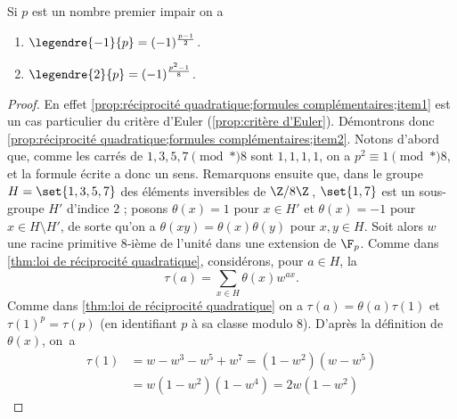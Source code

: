 \documentclass[11pt, useosf,
  title in boldface,
  theorem in new line,
  theorem numbering = section,
  number theorems separately,
]{simplivre}
\begin{document}
\enlargethispage*{\baselineskip}
    \begin{proposition}\label{prop:réciprocité quadratique;formules complémentaires}
        Si \( p \) est un nombre premier impair on a
        \begin{enumerate}
            \item \label{prop:réciprocité quadratique;formules complémentaires;item1} \( \legendre{-1}{p} = (-1)^{\frac{p-1}{2}} \).
            \item \label{prop:réciprocité quadratique;formules complémentaires;item2} \( \legendre{2}{p} = (-1)^{\frac{p^2-1}{8}} \).
        \end{enumerate}
    \end{proposition}
    \begin{proof}
        En effet \ref{prop:réciprocité quadratique;formules complémentaires;item1} est un cas particulier du critère d'Euler (\cref{prop:critère d'Euler}). Démontrons donc \ref{prop:réciprocité quadratique;formules complémentaires;item2}. Notons d'abord que, comme les carrés de \( 1,3,5,7 \pmod*{8} \) sont \( 1,1,1,1 \), on a \( p^2 \equiv 1 \pmod*{8} \), et la formule écrite a donc un sens. Remarquons ensuite que, dans le groupe \( H = \set{1,3,5,7} \) des éléments inversibles de \( \Z/8\Z \)\,, \( \set{1,7} \) est un sous-groupe \( H' \) d'indice \( 2 \) ; posons \( \theta(x) = 1 \) pour \( x \in H' \) et \( \theta(x) = -1 \) pour \( x \in H \setminus H' \), de sorte qu'on a \( \theta(xy) = \theta(x)\theta(y) \) pour \( x,y \in H \). Soit alors \( w \) une racine primitive \( 8 \)‑ième de l'unité dans une extension de \( \F_p \). Comme dans \cref{thm:loi de réciprocité quadratique}, considérons, pour \( a \in H \), la 
        \begin{equation}
            \tau(a) = \sum_{x \in H} \theta(x) w^{ax}.
        \end{equation}
        Comme dans \cref{thm:loi de réciprocité quadratique} on a \( \tau(a) = \theta(a) \tau(1) \) et \( \tau(1)^p = \tau(p) \) (en identifiant \( p \) à sa classe modulo \( 8 \)). D'après la définition de \( \theta(x) \), on~a
        \vspace{-.2\baselineskip}%
        {\allowdisplaybreaks%
        \begin{align*}
            \tau(1) &= w - w^3 - w^5 + w^7 = (1-w^2)(w-w^5)\\
            &= w(1-w^2)(1-w^4) = 2w(1-w^2)
        \end{align*}}%

\end{proof}
\end{document}
